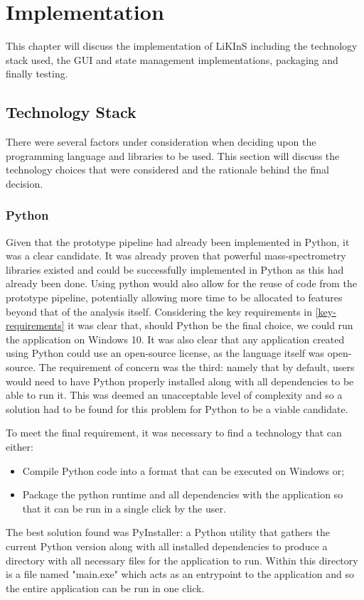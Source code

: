 \documentclass{l4proj}
\begin{document}
\chapter{Implementation}
This chapter will discuss the implementation of LiKInS including the technology stack used, the GUI and state management implementations, packaging and finally testing.

\section{Technology Stack}
There were several factors under consideration when deciding upon the programming language and libraries to be used. This section will discuss the technology choices that were considered and the rationale behind the final decision.
\subsection{Python}
Given that the prototype pipeline had already been implemented in Python, it was a clear candidate. It was already proven that powerful mass-spectrometry libraries existed and could be successfully implemented in Python as this had already been done. Using python would also allow for the reuse of code from the prototype pipeline, potentially allowing more time to be allocated to features beyond that of the analysis itself. Considering the key requirements in \ref{key-requirements} it was clear that, should Python be the final choice, we could run the application on Windows 10. It was also clear that any application created using Python could use an open-source license, as the language itself was open-source. The requirement of concern was the third: namely that by default, users would need to have Python properly installed along with all dependencies to be able to run it. This was deemed an unacceptable level of complexity and so a solution had to be found for this problem for Python to be a viable candidate.

To meet the final requirement, it was necessary to find a technology that can either:
\begin{itemize}
    \item  Compile Python code into a format that can be executed on Windows or;
\item Package the python runtime and all dependencies with the application so that it can be run in a single click by the user.
\end{itemize}
The best solution found was PyInstaller: a Python utility that gathers the current Python version along with all installed dependencies to produce a directory with all necessary files for the application to run. Within this directory is a file named "main.exe" which acts as an entrypoint to the application and so the entire application can be run in one click.
\end{document}
